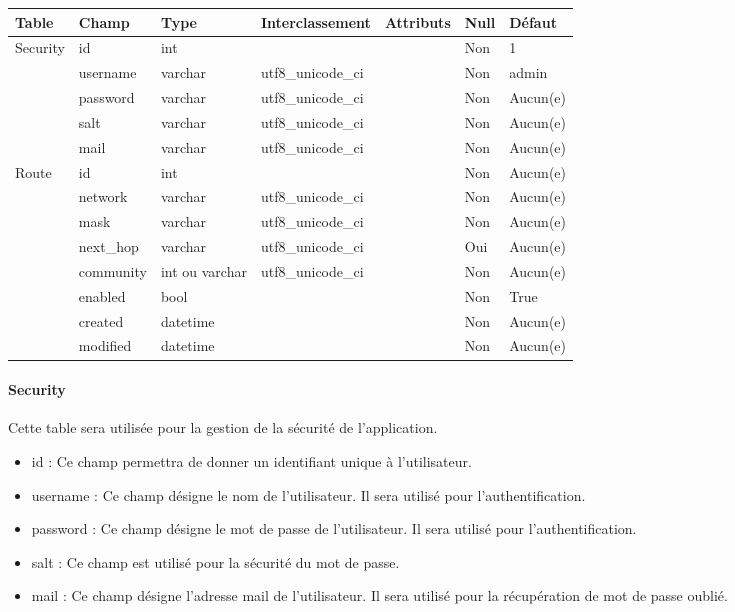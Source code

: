 \begin{tabular}{|l|l|l|l|l|l|l|} 
   \hline
    Table & Champ & Type & Interclassement & Attributs & Null & Défaut \\
    \hline
        Security & id & int &  &  & Non & 1 \\
    \cline{2-7} 
         & username & varchar & utf8\_unicode\_ci & & Non & admin \\
    \cline{2-7} 
         & password & varchar & utf8\_unicode\_ci & & Non & Aucun(e) \\
    \cline{2-7} 
         & salt & varchar & utf8\_unicode\_ci & & Non & Aucun(e) \\
    \cline{2-7} 
         & mail & varchar & utf8\_unicode\_ci & & Non & Aucun(e) \\
    \hline
        Route & id & int &  &  & Non & Aucun(e)\\
    \cline{2-7} 
         & network & varchar & utf8\_unicode\_ci & & Non & Aucun(e) \\
    \cline{2-7} 
         & mask & varchar & utf8\_unicode\_ci & & Non & Aucun(e) \\
    \cline{2-7} 
         & next\_hop & varchar & utf8\_unicode\_ci & & Oui & Aucun(e) \\ 
    \cline{2-7} 
         & community & int ou varchar & utf8\_unicode\_ci & & Non & Aucun(e) \\
    \cline{2-7} 
         & enabled & bool &  & & Non & True \\
    \cline{2-7} 
         & created & datetime &  & & Non & Aucun(e) \\
    \cline{2-7} 
         & modified & datetime &  & & Non & Aucun(e) \\
    \hline
\end{tabular}

\paragraph{Security} Cette table sera utilisée pour la gestion de la sécurité de l'application.
\begin{itemize}
    \item id : Ce champ permettra de donner un identifiant unique à l'utilisateur.
    \item username : Ce champ désigne le nom de l'utilisateur. Il sera utilisé pour l'authentification.
    \item password : Ce champ désigne le mot de passe de l'utilisateur. Il sera utilisé pour l'authentification.
    \item salt : Ce champ est utilisé pour la sécurité du mot de passe.
    \item mail : Ce champ désigne l'adresse mail de l'utilisateur. Il sera utilisé pour la récupération de mot de passe oublié.
\end{itemize}

